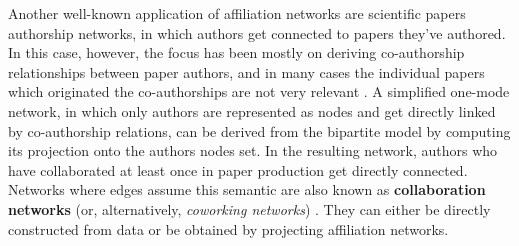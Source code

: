 Another well-known application of affiliation networks are scientific papers authorship networks, in which authors get connected to papers they've authored.
In this case, however, the focus has been mostly on deriving co-authorship relationships between paper authors, and in many cases the individual papers which originated the co-authorships are not very relevant \cite{Newman2004, Borrett2014}.
A simplified one-mode network, in which only authors are represented as nodes and get directly linked by co-authorship relations, can be derived from the bipartite model by computing its projection onto the authors nodes set.
In the resulting network, authors who have collaborated at least once in paper production get directly connected.
Networks where edges assume this semantic are also known as \textbf{collaboration networks} (or, alternatively, \textit{coworking networks}) \cite{Ramasco2004}.
They can either be directly constructed from data or be obtained by projecting affiliation networks.

